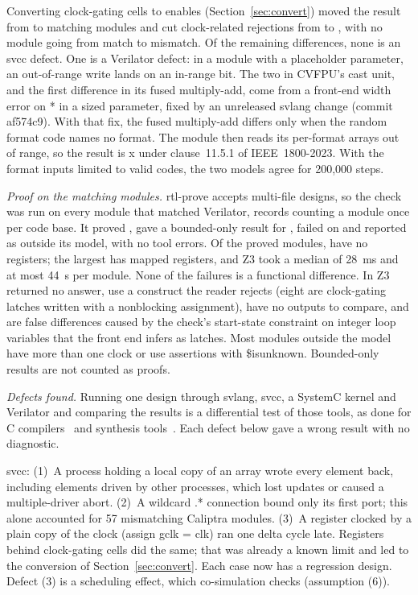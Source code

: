\documentclass{ieeeaccess}
\newcommand{\code}[1]{{\fontshape{n}\ttfamily #1}}
\begin{document}
Converting clock-gating cells to enables (Section~\ref{sec:convert}) moved the result from
\nMatchBeforeCG{} to \nMatch{} matching modules and cut clock-related rejections from
\nClockRejBefore{} to \nClockRejAfter{}, with no module going from match to mismatch. Of the
\nMismatch{} remaining differences, none is an \code{svcc} defect. One is a Verilator defect: in
a module with a placeholder parameter, an out-of-range write lands on an in-range bit. The two in
CVFPU's cast unit, and the first difference in its fused multiply-add, come from a front-end width
error on \code{**} in a sized parameter, fixed by an unreleased \code{svlang} change (commit
\code{af574c9}). With that fix, the fused multiply-add differs only when the random format code
names no format. The module then reads its per-format arrays out of range, so the result is x
under clause~11.5.1 of IEEE~1800-2023. With the format inputs limited to valid codes, the two
models agree for 200,000 steps.

\emph{Proof on the matching modules.} \code{rtl-prove} accepts multi-file designs, so the check was
run on every module that matched Verilator, \nProofRecords{} records counting a module once per
code base. It proved \nCorpusProved{}, gave a bounded-only result for \nCorpusBounded{}, failed on
\nCorpusFail{} and reported \nCorpusNotCovered{} as outside its model, with no tool errors. Of the
proved modules, \nCorpusComb{} have no registers; the largest has \nCorpusMaxRegs{} mapped
registers, and Z3 took a median of 28~ms and at most 44~s per module. None of the failures is a
functional difference. In \nCorpusUnknown{} Z3 returned no answer, \nCorpusUnsupported{} use a
construct the reader rejects (eight are clock-gating latches written with a nonblocking
assignment), \nCorpusNoOutputs{} have no outputs to compare, and \nCorpusFalseDiff{} are false
differences caused by the check's start-state constraint on \code{integer} loop variables that the
front end infers as latches. Most modules outside the model have more than one clock or use
assertions with \code{\$isunknown}. Bounded-only results are not counted as proofs.

\emph{Defects found.}
\label{sec:defects}
Running one design through \code{svlang}, \code{svcc}, a SystemC kernel and Verilator and comparing
the results is a differential test of those tools, as done for C
compilers~\cite{yang2011csmith} and synthesis tools~\cite{herklotz2020verismith}. Each defect
below gave a wrong result with no diagnostic.

\code{svcc}: (1)~A process holding a local copy of an array wrote every element back, including
elements driven by other processes, which lost updates or caused a multiple-driver abort. (2)~A
wildcard \code{.*} connection bound only its first port; this alone accounted for 57 mismatching
Caliptra modules. (3)~A register clocked by a plain copy of the clock (\code{assign gclk = clk}) ran
one delta cycle late. Registers behind clock-gating cells did the same; that was already a known
limit and led to the conversion of Section~\ref{sec:convert}. Each case now has a regression design.
Defect (3) is a scheduling effect, which co-simulation checks (assumption (6)).
\end{document}
